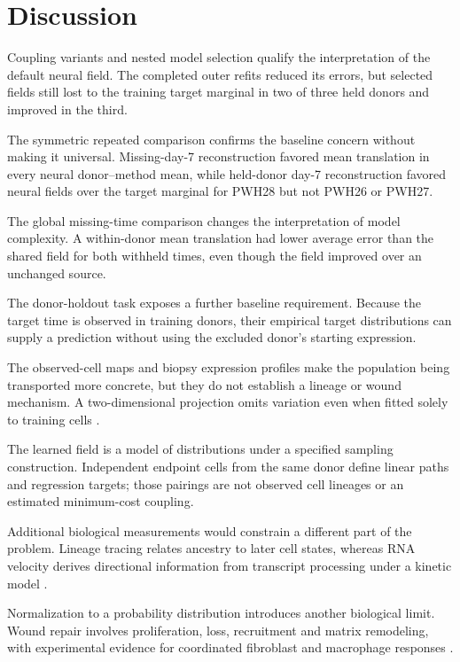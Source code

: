 \documentclass[10pt,a4paper]{article}
\begin{document}
\section{Discussion}

Coupling variants and nested model selection qualify the interpretation of the default neural field. The completed outer refits reduced its errors, but selected fields still lost to the training target marginal in two of three held donors and improved in the third.

The symmetric repeated comparison confirms the baseline concern without making it universal. Missing-day-7 reconstruction favored mean translation in every neural donor--method mean, while held-donor day-7 reconstruction favored neural fields over the target marginal for PWH28 but not PWH26 or PWH27.

The global missing-time comparison changes the interpretation of model complexity. A within-donor mean translation had lower average error than the shared field for both withheld times, even though the field improved over an unchanged source.

The donor-holdout task exposes a further baseline requirement. Because the target time is observed in training donors, their empirical target distributions can supply a prediction without using the excluded donor's starting expression.

The observed-cell maps and biopsy expression profiles make the population being transported more concrete, but they do not establish a lineage or wound mechanism. A two-dimensional projection omits variation even when fitted solely to training cells \citep{huang2022visualization}.

The learned field is a model of distributions under a specified sampling construction. Independent endpoint cells from the same donor define linear paths and regression targets; those pairings are not observed cell lineages or an estimated minimum-cost coupling.

Additional biological measurements would constrain a different part of the problem. Lineage tracing relates ancestry to later cell states, whereas RNA velocity derives directional information from transcript processing under a kinetic model \citep{weinreb2020,lamanno2018,bergen2020}.

Normalization to a probability distribution introduces another biological limit. Wound repair involves proliferation, loss, recruitment and matrix remodeling, with experimental evidence for coordinated fibroblast and macrophage responses \citep{rognoni2018,shook2018}.
\end{document}

